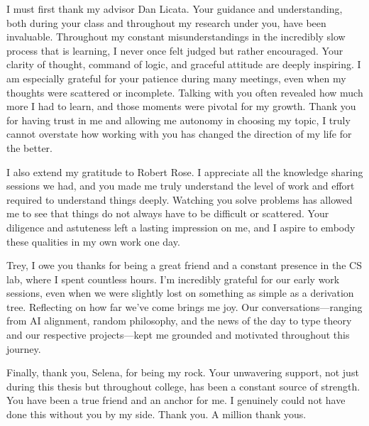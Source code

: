 \documentclass[main.tex]{subfiles}
\begin{document}
I must first thank my advisor Dan Licata. Your guidance and understanding, both during your class and throughout my research under you, have been invaluable. Throughout my constant misunderstandings in the incredibly slow process that is learning, I never once felt judged but rather encouraged. Your clarity of thought, command of logic, and graceful attitude are deeply inspiring.  I am especially grateful for your patience during many meetings, even when my thoughts were scattered or incomplete. Talking with you often revealed how much more I had to learn, and those moments were pivotal for my growth. Thank you for having trust in me and allowing me autonomy in choosing my topic, I truly cannot overstate how working with you has changed the direction of my life for the better. 

I also extend my gratitude to Robert Rose. I appreciate all the knowledge sharing sessions we had, and you made me truly understand the level of work and effort required to understand things deeply. Watching you solve problems has allowed me to see that things do not always have to be difficult or scattered. Your diligence and astuteness left a lasting impression on me, and I aspire to embody these qualities in my own work one day.

Trey, I owe you thanks for being a great friend and a constant presence in the CS lab, where I spent countless hours. I’m incredibly grateful for our early work sessions, even when we were slightly lost on something as simple as a derivation tree. Reflecting on how far we’ve come brings me joy. Our conversations—ranging from AI alignment, random philosophy, and the news of the day to type theory and our respective projects—kept me grounded and motivated throughout this journey.

Finally, thank you, Selena, for being my rock. Your unwavering support, not just during this thesis but throughout college, has been a constant source of strength. You have been a true friend and an anchor for me. I genuinely could not have done this without you by my side. Thank you. A million thank yous.
\end{document}
